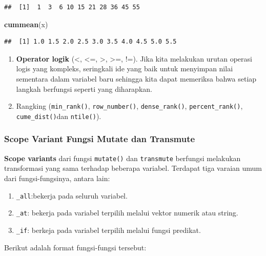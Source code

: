 \documentclass[]{book}
\newenvironment{Shaded}{\begin{snugshade}}{\end{snugshade}}
\newcommand{\KeywordTok}[1]{\textcolor[rgb]{0.13,0.29,0.53}{\textbf{#1}}}
\newcommand{\NormalTok}[1]{#1}
\providecommand{\tightlist}{%
  \setlength{\itemsep}{0pt}\setlength{\parskip}{0pt}}
\begin{document}
\begin{verbatim}
##  [1]  1  3  6 10 15 21 28 36 45 55
\end{verbatim}

\begin{Shaded}
\begin{Highlighting}[]
\KeywordTok{cummean}\NormalTok{(x)}
\end{Highlighting}
\end{Shaded}

\begin{verbatim}
##  [1] 1.0 1.5 2.0 2.5 3.0 3.5 4.0 4.5 5.0 5.5
\end{verbatim}

\begin{enumerate}
\def\labelenumi{\arabic{enumi}.}
\setcounter{enumi}{4}
\item
  \textbf{Operator logik} (\textless{}, \textless{}=, \textgreater{},
  \textgreater{}=, !=). Jika kita melakukan urutan operasi logis yang
  kompleks, seringkali ide yang baik untuk menyimpan nilai sementara
  dalam variabel baru sehingga kita dapat memeriksa bahwa setiap langkah
  berfungsi seperti yang diharapkan.
\item
  Rangking (\texttt{min\_rank()}, \texttt{row\_number()},
  \texttt{dense\_rank()}, \texttt{percent\_rank()},
  \texttt{cume\_dist()}dan \texttt{ntile()}).
\end{enumerate}

\subsubsection{Scope Variant Fungsi Mutate dan
Transmute}\label{scope-variant-fungsi-mutate-dan-transmute}

\textbf{Scope variants} dari fungsi \texttt{mutate()} dan
\texttt{transmute} berfungsi melakukan transformasi yang sama terhadap
beberapa variabel. Terdapat tiga varaian umum dari fungsi-fungsinya,
antara lain:

\begin{enumerate}
\def\labelenumi{\arabic{enumi}.}
\tightlist
\item
  \texttt{\_all}:bekerja pada seluruh variabel.
\item
  \texttt{\_at}: bekerja pada variabel terpilih melalui vektor numerik
  atau string.
\item
  \texttt{\_if}: berkeja pada variabel terpilih melalui fungsi predikat.
\end{enumerate}

Berikut adalah format fungsi-fungsi tersebut:
\end{document}
